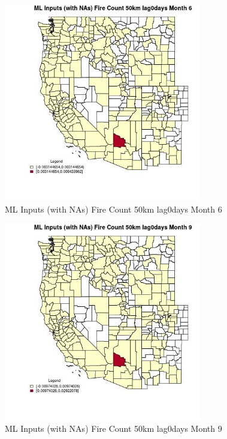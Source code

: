 \begin{figure} 
\centering  
\includegraphics[width=0.77\textwidth]{Code_Outputs/Report_ML_input_PM25_Step4_part_e_de_duplicated_aves_compiled_2019-05-20wNAs_CountyFire_Count_50km_lag0daysmedianMonth6.jpg} 
\caption{\label{fig:Report_ML_input_PM25_Step4_part_e_de_duplicated_aves_compiled_2019-05-20wNAsCountyFire_Count_50km_lag0daysmedianMonth6}ML Inputs (with NAs) Fire Count 50km lag0days Month 6} 
\end{figure} 
 

\clearpage 

\begin{figure} 
\centering  
\includegraphics[width=0.77\textwidth]{Code_Outputs/Report_ML_input_PM25_Step4_part_e_de_duplicated_aves_compiled_2019-05-20wNAs_CountyFire_Count_50km_lag0daysmedianMonth9.jpg} 
\caption{\label{fig:Report_ML_input_PM25_Step4_part_e_de_duplicated_aves_compiled_2019-05-20wNAsCountyFire_Count_50km_lag0daysmedianMonth9}ML Inputs (with NAs) Fire Count 50km lag0days Month 9} 
\end{figure} 
 

